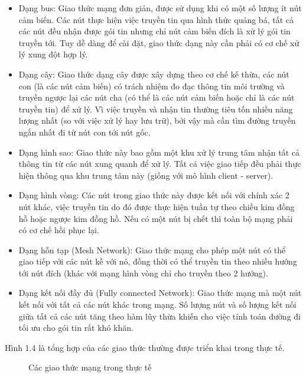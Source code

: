 \begin{itemize}
\item Dạng bus: Giao thức mạng đơn giản, được sử dụng khi có một số lượng ít nút cảm biến. Các nút thực hiện việc truyền tin qua hình thức quảng bá, tất cả các nút đều nhận được gói tin nhưng chỉ nút cảm biến đích là xử lý gói tin truyền tới. Tuy dễ dàng để cài đặt, giao thức dạng này cần phải có cơ chế xử lý xung đột hợp lý.
\item Dạng cây: Giao thức dạng cây được xây dựng theo cơ chế kế thừa, các nút con (là các nút cảm biến) có trách nhiệm đo đạc thông tin môi trường và truyền ngược lại các nút cha (có thể là các nút cảm biến hoặc chỉ là các nút truyền tin) để xử lý. Vì việc truyền và nhận tin thường tiêu tốn nhiều năng lượng nhất (so với việc xử lý hay lưu trữ), bởi vậy mà cần tìm đường truyền ngắn nhất đi từ nút con tới nút gốc.
\item Dạng hình sao: Giao thức này bao gồm một khu xử lý trung tâm nhận tất cả thông tin từ các nút xung quanh để xử lý. Tất cả việc giao tiếp đều phải thực hiện thông qua khu trung tâm này (giống với mô hình client - server). 
\item Dạng hình vòng: Các nút trong giao thức này được kết nối với chính xác 2 nút khác, việc truyền tin do đó được thực hiện tuần tự theo chiều kim đồng hồ hoặc ngược kim đồng hồ. Nếu có một nút bị chết thì toàn bộ mạng phải có cơ chế hồi phục lại.
\item Dạng hỗn tạp (Mesh Network): Giao thức mạng cho phép một nút có thể giao tiếp với các nút kề với nó, đồng thời có thể truyền tin theo nhiều hướng tới nút đích (khác với mạng hình vòng chỉ cho truyền theo 2 hướng).
\item Dạng kết nối đầy đủ (Fully connected Network): Giao thức mạng mà một nút kết nối với tất cả các nút khác trong mạng. Số lượng nút và số lượng kết nối giữa tất cả các nút tăng theo hàm lũy thừa khiến cho việc tính toán đường đi tối ưu cho gói tin rất khó khăn.
\end{itemize}
 
Hình 1.4 là tổng hợp của các giao thức thường được triển khai trong thực tế.


\begin{figure}[htb]
	\caption{\label{fig:my-label} Các giao thức mạng trong thực tế}
\end{figure}

